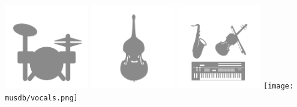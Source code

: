 \includegraphics{musdb/drums.png}
\includegraphics{musdb/bass.png}
\includegraphics{musdb/other.png}
\texttt{[image: musdb/vocals.png]}
